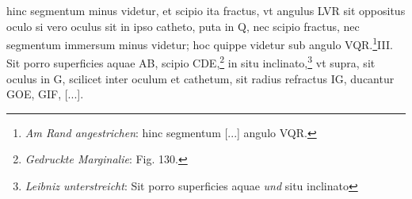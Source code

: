 \pend \pstart [p.~159] [...] hinc segmentum minus videtur, et scipio ita fractus, vt angulus LVR sit oppositus oculo\protect{} si vero oculus\protect{} sit in ipso catheto, puta in Q, nec scipio fractus, nec segmentum immersum minus videtur; hoc quippe videtur sub angulo VQR.\footnote{\textit{Am Rand angestrichen}: hinc segmentum [...] angulo VQR.}\pend \pstart  III. Sit porro superficies aquae AB, scipio CDE,\footnote{\textit{Gedruckte Marginalie}: Fig. 130.} in situ inclinato,\footnote{\textit{Leibniz unterstreicht}: Sit porro superficies aquae \textit{und} situ inclinato} vt supra, sit oculus\protect{} in G, scilicet inter oculum\protect{} et cathetum, sit radius refractus\protect{} IG, ducantur GOE, GIF, [...].
